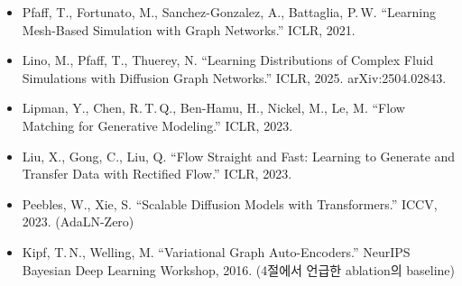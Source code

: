 \documentclass[11pt]{article}
\begin{document}
\begin{itemize}
\item Pfaff, T., Fortunato, M., Sanchez-Gonzalez, A., Battaglia, P.\,W.
  ``Learning Mesh-Based Simulation with Graph Networks.'' ICLR, 2021.
\item Lino, M., Pfaff, T., Thuerey, N. ``Learning Distributions of
  Complex Fluid Simulations with Diffusion Graph Networks.'' ICLR, 2025.
  arXiv:2504.02843.
\item Lipman, Y., Chen, R.\,T.\,Q., Ben-Hamu, H., Nickel, M., Le, M.
  ``Flow Matching for Generative Modeling.'' ICLR, 2023.
\item Liu, X., Gong, C., Liu, Q. ``Flow Straight and Fast: Learning to
  Generate and Transfer Data with Rectified Flow.'' ICLR, 2023.
\item Peebles, W., Xie, S. ``Scalable Diffusion Models with
  Transformers.'' ICCV, 2023. (AdaLN-Zero)
\item Kipf, T.\,N., Welling, M. ``Variational Graph Auto-Encoders.''
  NeurIPS Bayesian Deep Learning Workshop, 2016. (4절에서 언급한
  ablation의 baseline)
\end{itemize}
\end{document}
